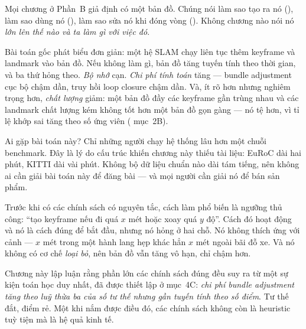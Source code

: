\documentclass[../../vslam.tex]{subfiles}
\begin{document}
Mọi chương ở Phần~B giả định có một bản đồ. Chúng nói làm sao tạo ra nó (), làm sao dùng nó (), làm sao sửa nó khi đóng vòng (). Không chương nào nói nó \emph{lớn lên thế nào và ta làm gì với việc đó}.

Bài toán gốc phát biểu đơn giản: một hệ SLAM chạy liên tục thêm keyframe và landmark vào bản đồ. Nếu không làm gì, bản đồ tăng tuyến tính theo thời gian, và ba thứ hỏng theo. \emph{Bộ nhớ} cạn. \emph{Chi phí tính toán} tăng --- bundle adjustment cục bộ chậm dần, truy hồi loop closure chậm dần. Và, ít rõ hơn nhưng nghiêm trọng hơn, \emph{chất lượng} giảm: một bản đồ đầy các keyframe gần trùng nhau và các landmark chất lượng kém không tốt hơn một bản đồ gọn gàng --- nó tệ hơn, vì tỉ lệ khớp sai tăng theo số ứng viên ( mục~2B).

Ai gặp bài toán này? Chỉ những người chạy hệ thống lâu hơn một chuỗi benchmark. Đây là lý do cấu trúc khiến chương này thiếu tài liệu: EuRoC dài hai phút, KITTI dài vài phút. Không bộ dữ liệu chuẩn nào dài tám tiếng, nên không ai cần giải bài toán này để đăng bài --- và mọi người cần giải nó để bán sản phẩm.

Trước khi có các chính sách có nguyên tắc, cách làm phổ biến là ngưỡng thủ công: ``tạo keyframe nếu đi quá \(x\) mét hoặc xoay quá \(y\) độ''. Cách đó hoạt động và nó là cách đúng để bắt đầu, nhưng nó hỏng ở hai chỗ. Nó không thích ứng với cảnh --- \(x\) mét trong một hành lang hẹp khác hẳn \(x\) mét ngoài bãi đỗ xe. Và nó không có cơ chế \emph{loại bỏ}, nên bản đồ vẫn tăng vô hạn, chỉ chậm hơn.

Chương này lập luận rằng phần lớn các chính sách đúng đều suy ra từ một sự kiện toán học duy nhất, đã được thiết lập ở  mục~4C: \emph{chi phí bundle adjustment tăng theo luỹ thừa ba của số tư thế nhưng gần tuyến tính theo số điểm}. Tư thế đắt, điểm rẻ. Một khi nắm được điều đó, các chính sách không còn là heuristic tuỳ tiện mà là hệ quả kinh tế.
\end{document}
